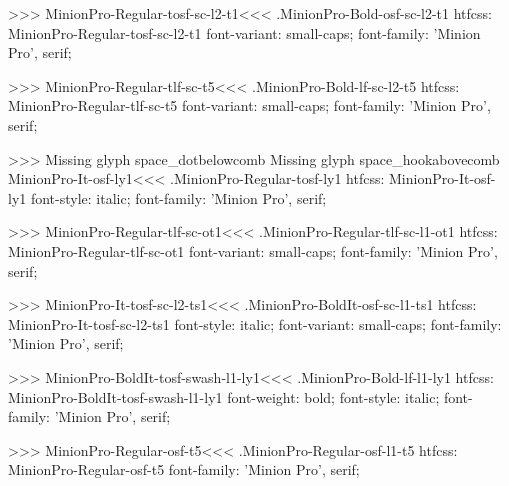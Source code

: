 {{>>>
\<MinionPro-Regular-tosf-sc-l2-t1\><<<
.MinionPro-Bold-osf-sc-l2-t1
htfcss:  MinionPro-Regular-tosf-sc-l2-t1  font-variant: small-caps; font-family: 'Minion Pro', serif;

>>>
\<MinionPro-Regular-tlf-sc-t5\><<<
.MinionPro-Bold-lf-sc-l2-t5
htfcss:  MinionPro-Regular-tlf-sc-t5  font-variant: small-caps; font-family: 'Minion Pro', serif;

>>>
Missing glyph	space_dotbelowcomb
Missing glyph	space_hookabovecomb
\<MinionPro-It-osf-ly1\><<<
.MinionPro-Regular-tosf-ly1
htfcss:  MinionPro-It-osf-ly1  font-style: italic; font-family: 'Minion Pro', serif;

>>>
\<MinionPro-Regular-tlf-sc-ot1\><<<
.MinionPro-Regular-tlf-sc-l1-ot1
htfcss:  MinionPro-Regular-tlf-sc-ot1  font-variant: small-caps; font-family: 'Minion Pro', serif;

>>>
\<MinionPro-It-tosf-sc-l2-ts1\><<<
.MinionPro-BoldIt-osf-sc-l1-ts1
htfcss:  MinionPro-It-tosf-sc-l2-ts1  font-style: italic; font-variant: small-caps; font-family: 'Minion Pro', serif;

>>>
\<MinionPro-BoldIt-tosf-swash-l1-ly1\><<<
.MinionPro-Bold-lf-l1-ly1
htfcss:  MinionPro-BoldIt-tosf-swash-l1-ly1  font-weight: bold; font-style: italic; font-family: 'Minion Pro', serif;

>>>
\<MinionPro-Regular-osf-t5\><<<
.MinionPro-Regular-osf-l1-t5
htfcss:  MinionPro-Regular-osf-t5  font-family: 'Minion Pro', serif;

}}

